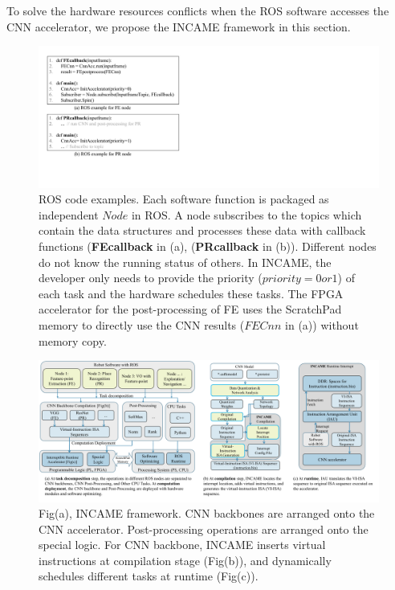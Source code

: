 \label{sec:incame}

To solve the hardware resources conflicts when the ROS software accesses the CNN accelerator, we propose the INCAME framework in this section.



\begin{figure}[t]
	\centering
    \includegraphics[width=0.9\linewidth]{fig/codeexample.pdf}
    \vspace{-6mm}
    \caption{ ROS code examples. Each software function is packaged as independent $Node$ in ROS. A node subscribes to the topics which contain the data structures and processes these data with callback functions (\textbf{FEcallback} in (a), (\textbf{PRcallback} in (b)). Different nodes do not know the running status of others. In INCAME, the developer only needs to provide the priority ($priority=0 or 1$) of each task and the hardware schedules these tasks. The FPGA accelerator for the post-processing of FE uses the ScratchPad memory to directly use the CNN results ($FECnn$ in (a)) without memory copy. 
    }
	\label{fig:rosexample}
\end{figure}

\begin{figure}[t]
	\centering
    \includegraphics[width=0.99\linewidth]{fig/incame.pdf}
    \vspace{-1mm} 
    \caption{ Fig(a), INCAME framework. CNN backbones are arranged onto the CNN accelerator. Post-processing operations are arranged onto the special logic. For CNN backbone, INCAME inserts virtual instructions at compilation stage (Fig(b)), and dynamically schedules different tasks at runtime (Fig(c)). }
	\label{fig:incame}
\end{figure}

